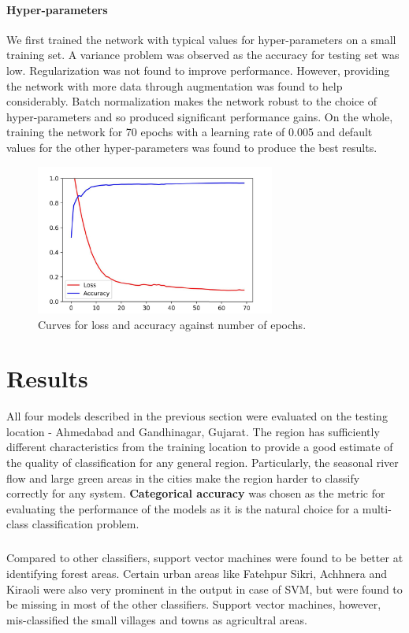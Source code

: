 \documentclass[12pt, a4paper]{report}
\begin{document}
\subsubsection{Hyper-parameters}
We first trained the network with typical values for hyper-parameters on a small training set. A variance problem was observed as the accuracy for testing set was low. Regularization was not found to improve performance. However, providing the network with more data through augmentation was found to help considerably. Batch normalization makes the network robust to the choice of hyper-parameters and so produced significant performance gains. On the whole, training the network for 70 epochs with a learning rate of 0.005 and default values for the other hyper-parameters was found to produce the best results.
\begin{figure}[h]
\centering
\includegraphics[width=0.7\textwidth]{train_history.jpg}
\caption{Curves for loss and accuracy against number of epochs.}
\end{figure}


\chapter{Results}
\vspace{0.5cm}
All four models described in the previous section were evaluated on the testing location - Ahmedabad and Gandhinagar, Gujarat. The region has sufficiently different characteristics from the training location to provide a good estimate of the quality of classification for any general region. Particularly, the seasonal river flow and large green areas in the cities make the region harder to classify correctly for any system. \textbf{Categorical accuracy} was chosen as the metric for evaluating the performance of the models as it is the natural choice for a multi-class classification problem.
\paragraph{}
Compared to other classifiers, support vector machines were found to be better at identifying forest areas. Certain urban areas like Fatehpur Sikri, Achhnera and Kiraoli were also very prominent in the output in case of SVM, but were found to be missing in most of the other classifiers. Support vector machines, however, mis-classified the small villages and towns as agricultral areas. 
\end{document}
